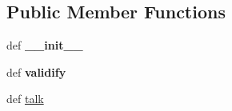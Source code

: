 \subsection*{Public Member Functions}
\begin{DoxyCompactItemize}
\item 
\hypertarget{classGameObject_1_1Bot_ae14fbf2780a8ee51c224f9fa2e841a27}{
def {\bfseries \_\-\_\-init\_\-\_\-}}
\label{classGameObject_1_1Bot_ae14fbf2780a8ee51c224f9fa2e841a27}

\item 
\hypertarget{classGameObject_1_1Bot_a519b951174aa9a7c58cf41e5ba4c237d}{
def {\bfseries validify}}
\label{classGameObject_1_1Bot_a519b951174aa9a7c58cf41e5ba4c237d}

\item 
\hypertarget{classGameObject_1_1Bot_ab6f7a4db8f18482b6016ce4fd42978ad}{
def \hyperlink{classGameObject_1_1Bot_ab6f7a4db8f18482b6016ce4fd42978ad}{talk}}
\label{classGameObject_1_1Bot_ab6f7a4db8f18482b6016ce4fd42978ad}


\end{DoxyCompactItemize}
